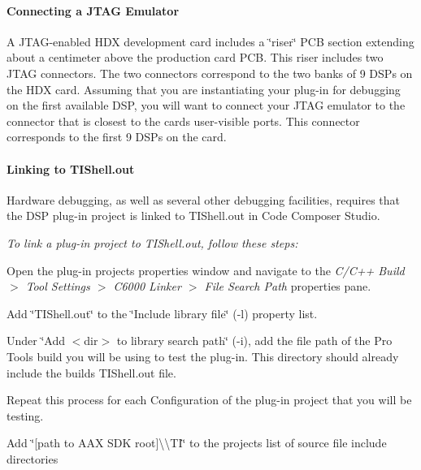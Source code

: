 \hypertarget{a00832_subsubsection__connecting_a_jtag_emulator}{}\paragraph{Connecting a J\+T\+A\+G Emulator}\label{a00832_subsubsection__connecting_a_jtag_emulator}
 A J\+T\+A\+G-\/enabled H\+DX development card includes a \char`\"{}riser\char`\"{} P\+CB section extending about a centimeter above the production card P\+CB. This riser includes two J\+T\+AG connectors. The two connectors correspond to the two banks of 9 D\+S\+Ps on the H\+DX card. Assuming that you are instantiating your plug-\/in for debugging on the first available D\+SP, you will want to connect your J\+T\+AG emulator to the connector that is closest to the card\textquotesingle{}s user-\/visible ports. This connector corresponds to the first 9 D\+S\+Ps on the card.

\hypertarget{a00832_subsubsection__linking_to_tishellout_}{}\paragraph{Linking to T\+I\+Shell.\+out}\label{a00832_subsubsection__linking_to_tishellout_}
 Hardware debugging, as well as several other debugging facilities, requires that the D\+SP plug-\/in project is linked to T\+I\+Shell.\+out in Code Composer Studio.

{\itshape  To link a plug-\/in project to T\+I\+Shell.\+out, follow these steps\+:} 
\begin{DoxyEnumerate}
\item Open the plug-\/in project\textquotesingle{}s properties window and navigate to the {\itshape C/\+C++ Build $>$ Tool Settings $>$ C6000 Linker $>$ File Search Path} properties pane.  
\item Add \char`\"{}\+T\+I\+Shell.\+out\char`\"{} to the \char`\"{}\+Include library file\char`\"{} ({\ttfamily -\/l}) property list.  
\item Under \char`\"{}\+Add $<$dir$>$ to library search path\char`\"{} ({\ttfamily -\/i}), add the file path of the Pro Tools build you will be using to test the plug-\/in. This directory should already include the build\textquotesingle{}s T\+I\+Shell.\+out file.  
\item Repeat this process for each Configuration of the plug-\/in project that you will be testing.  
\item Add \char`\"{}\mbox{[}path to A\+A\+X S\+D\+K root\mbox{]}\textbackslash{}\textbackslash{}\+T\+I\char`\"{} to the project\textquotesingle{}s list of source file include directories  
\end{DoxyEnumerate}

